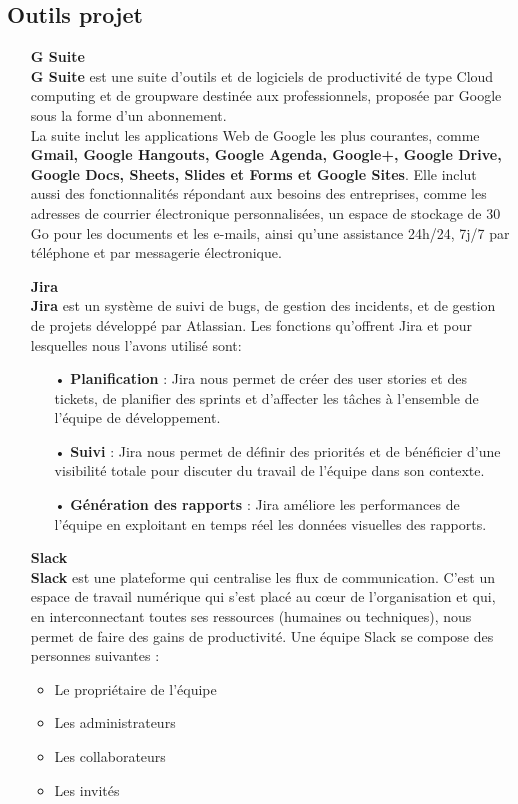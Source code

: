 \documentclass[12pt]{report}
\begin{document}
	  \subsection{Outils projet}
	    \begin{itemize}
	      \item[\ding{42}] \textbf{G Suite}\\
		\textbf{G Suite} est une suite d'outils et de logiciels de productivité de type Cloud computing et de groupware destinée aux professionnels, proposée par Google sous la forme d'un abonnement.
		\\La suite inclut les applications Web de Google les plus courantes, comme \textbf{Gmail, Google Hangouts, Google Agenda, Google+, Google Drive, Google Docs, Sheets, Slides et Forms et Google Sites}. Elle inclut aussi des fonctionnalités répondant aux besoins des entreprises, comme les adresses de courrier électronique personnalisées, un espace de stockage de 30 Go pour les documents et les e-mails, ainsi qu'une assistance 24h/24, 7j/7 par téléphone et par messagerie électronique.

	      \item[\ding{42}] \textbf{Jira}\\
		\textbf{Jira} est un système de suivi de bugs, de gestion des incidents, et de gestion de projets développé par Atlassian. Les fonctions qu'offrent Jira et pour lesquelles nous l'avons utilisé sont:
		\begin{itemize}
		  \item[•] \textbf{Planification} : Jira nous permet de créer des user stories et des tickets, de planifier des sprints et d'affecter les tâches à l'ensemble de l'équipe de développement.
		  \item[•] \textbf{Suivi} : Jira nous permet de définir des priorités et de bénéficier d'une visibilité totale pour discuter du travail de l'équipe dans son contexte.
		  \item[•] \textbf{Génération des rapports} : Jira améliore les performances de l'équipe en exploitant en temps réel les données visuelles des rapports.
		\end{itemize}
     
	      \item[\ding{42}] \textbf{Slack}\\
		\textbf{Slack} est une plateforme qui centralise les flux de communication. C'est un espace de travail numérique qui s'est placé au cœur de l'organisation et qui, en interconnectant toutes ses ressources (humaines ou techniques), nous permet de faire des gains de productivité. Une équipe Slack se compose des personnes suivantes :
		\begin{itemize}
		  \item Le propriétaire de l'équipe
		  \item Les administrateurs
		  \item Les collaborateurs
		  \item Les invités
		\end{itemize}
	  \end{itemize}
	  
\end{document}
